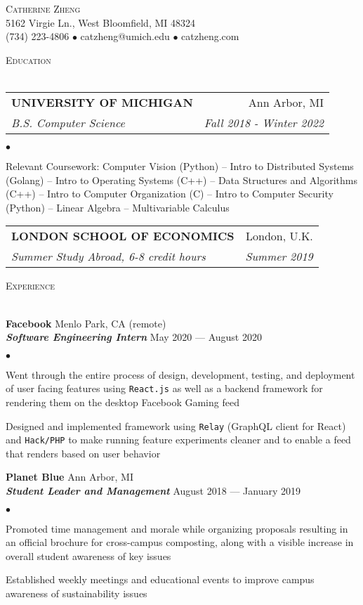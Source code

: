 \documentclass[a4paper, 11pt]{article}
\makeatletter
\newcommand{\lineunder}{\vspace*{-8pt} \\ \hspace*{-20pt} \hrulefill \\}
\newcommand{\header}[1]{{\hspace*{-20pt}\vspace*{6pt} \large\textsc{#1}} \vspace*{-5pt} \lineunder \vspace{3pt}}
\newcommand{\employer}[4]{{ \normalsize\textbf{#1} \small\hfill{#2}\\ {\small\textbf{\emph{#3}}} \small\hfill{#4}\\ }}
\newcommand{\contact}[3]{
\vspace*{-5pt}
\begin{center}
{\huge \scshape {#1}}\\
\vspace{2pt}
#2\\
#3
\end{center}
\vspace*{-10pt}
}
\newenvironment{achievements}{\begin{list}{$\bullet$}{\topsep 0pt \itemsep 0pt}}{\vspace*{5pt}\end{list}}
\newcommand{\school}[4]{
\begin{tabular*}{6.55in}{l@{\extracolsep{\fill}}r}
	\uppercase{\normalsize\textbf{#1}} & #2 \\
	\textit{#3} & \textit{#4}\\
\end{tabular*}\vspace*{3pt}}
\makeatother
\begin{document}
\small
\smallskip
\vspace*{-40pt}

\contact{Catherine Zheng}
{\small5162 Virgie Ln., West Bloomfield, MI 48324}
{\small(734) 223-4806 $\bullet$ catzheng@umich.edu  $\bullet$ catzheng.com}

\vspace{10pt}
\header{Education}

\vspace{1ex}
\school{University of Michigan}{Ann Arbor, MI}{B.S. Computer Science}{Fall 2018 - Winter 2022}
\begin{achievements}
\item Relevant Coursework: Computer Vision (Python) -- Intro to Distributed Systems (Golang) -- Intro to Operating Systems (C++) -- Data Structures and Algorithms (C++) -- Intro to Computer Organization (C) -- Intro to Computer Security (Python) -- Linear Algebra -- Multivariable Calculus
\end{achievements}
\vspace{1pt}
\school{London School of Economics}{London, U.K.}{Summer Study Abroad, 6-8 credit hours}{Summer 2019}
\vspace{1pt}

\header{Experience}

\employer{Facebook}{Menlo Park, CA (remote)}{Software Engineering Intern}{May 2020 --- August 2020}
	\begin{achievements}
	\item Went through the entire process of design, development, testing, and deployment of user facing features using \texttt{React.js} as well as a backend framework for rendering them on the desktop Facebook Gaming feed
	\item Designed and implemented framework using \texttt{Relay} (GraphQL client for React) and \texttt{Hack/PHP} to make running feature experiments cleaner and to enable a feed that renders based on user behavior
	\end{achievements}

\employer{Planet Blue}{Ann Arbor, MI}{Student Leader and Management}{August 2018 --- January 2019}
	\begin{achievements}
	\item Promoted time management and morale while organizing proposals resulting in an official brochure for cross-campus composting, along with a visible increase in overall student awareness of key issues
	\item Established weekly meetings and educational events to improve campus awareness of sustainability issues
	\end{achievements}
\end{document}
